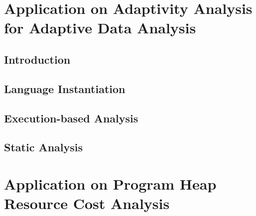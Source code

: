 \documentclass[a4paper,11pt]{article}
\begin{document}
% 
% 

\section{Application on Adaptivity Analysis for Adaptive Data Analysis}
\label{sec:furthers}
\subsection{Introduction}

\subsection{Language Instantiation}

\subsection{Execution-based Analysis}

\subsection{Static Analysis}

% 
% 
\section{Application on Program Heap Resource Cost Analysis}
\label{sec:furthers}
\end{document}
